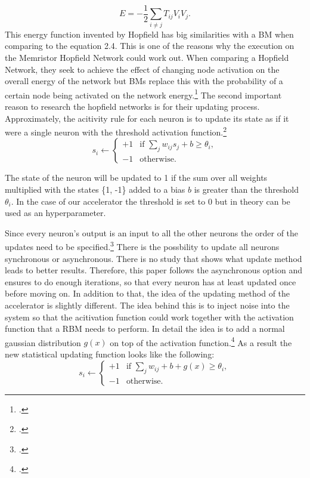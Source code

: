 \begin{equation}
    E = -\frac{1}{2} \sum_{i \neq j} T_{ij} V_i V_j .
\end{equation}
This energy function invented by Hopfield has big similarities with a \ac{BM} when comparing to the
equation 2.4. This is one of the reasons why the execution on the Memristor Hopfield Network could work out.
When comparing a Hopfield Network, they seek to achieve the effect of changing node activation on the overall energy of the network but \ac{BM}s replace this with the probability of a certain node being activated on the network energy.\footcite[cf.][7]{ahadNeuralNetworksWireless2016}
The second important reason to research the hopfield networks is for their updating process.
Approximately, the acitivity rule for each neuron is to update its state as if it were a single neuron with the threshold activation function.\footcite[cf.][506]{mackayInformationTheoryInference2003}
\[
s_i \leftarrow 
\begin{cases} 
+1 & \text{if } \sum_j w_{ij} s_j + b \geq \theta_i, \\
-1 & \text{otherwise}.
\end{cases}
\]

The state of the neuron will be updated to 1 if the sum over all weights multiplied with the states \{1, -1\} added to a bias \( b \)  is greater than the threshold \( \theta_i \).
In the case of our accelerator the threshold is set to 0 but in theory can be used as an hyperparameter.

Since every neuron's output is an input to all the other neurons the order of the updates need to be specified.\footcite[cf.][506]{mackayInformationTheoryInference2003}
There is the possbility to update all neurons synchronous or asynchronous. 
There is no study that shows what update method leads to better results.
Therefore, this paper follows the asynchronous option and ensures to do enough iterations, so that every neuron has at least updated once before moving on.
In addition to that, the idea of the updating method of the accelerator is slightly different. The idea behind this is to inject noise into the system so that the acitivation function could work together with the activation function that a \ac{RBM} needs to perform. 
In detail the idea is to add a normal gaussian distribution \( g(x) \) on top of the activation function.\footcite[cf.][4-5]{bohmNoiseinjectedAnalogIsing2022}
As a result the new statistical updating function looks like the following:
\[
s_i \leftarrow 
\begin{cases} 
+1 & \text{if } \sum_j w_{ij}  + b + g(x) \geq \theta_i, \\
-1 & \text{otherwise}.
\end{cases}
\]

